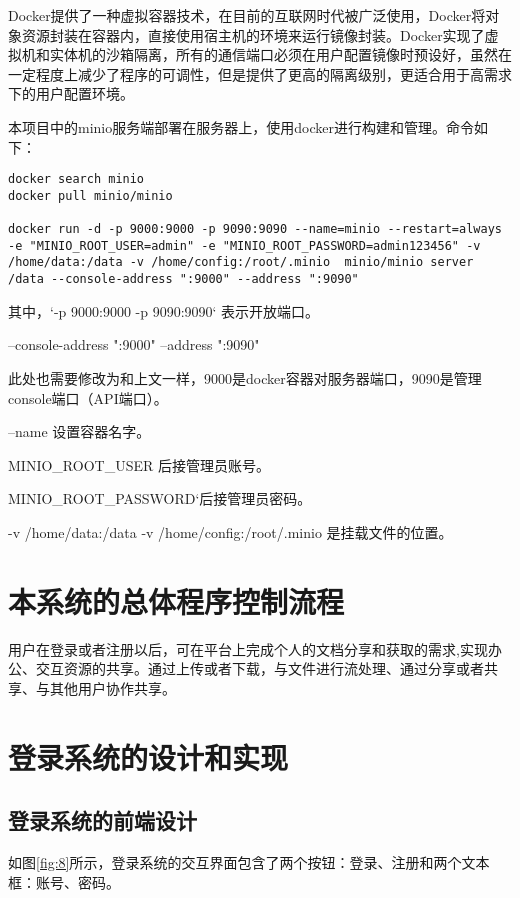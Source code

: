 \documentclass[forprint]{software}
\begin{document}
Docker提供了一种虚拟容器技术，在目前的互联网时代被广泛使用，Docker将对象资源封装在容器内，直接使用宿主机的环境来运行镜像封装。Docker实现了虚拟机和实体机的沙箱隔离，所有的通信端口必须在用户配置镜像时预设好，虽然在一定程度上减少了程序的可调性，但是提供了更高的隔离级别，更适合用于高需求下的用户配置环境。

本项目中的minio服务端部署在服务器上，使用docker进行构建和管理。命令如下：

\begin{lstlisting}
docker search minio
docker pull minio/minio

docker run -d -p 9000:9000 -p 9090:9090 --name=minio --restart=always -e "MINIO_ROOT_USER=admin" -e "MINIO_ROOT_PASSWORD=admin123456" -v /home/data:/data -v /home/config:/root/.minio  minio/minio server /data --console-address ":9000" --address ":9090"
\end{lstlisting}

其中，`-p 9000:9000 -p 9090:9090` 表示开放端口。

--console-address ":9000" --address ":9090"

此处也需要修改为和上文一样，9000是docker容器对服务器端口，9090是管理console端口（API端口）。

--name 设置容器名字。

MINIO\_ROOT\_USER 后接管理员账号。

MINIO\_ROOT\_PASSWORD`后接管理员密码。

-v /home/data:/data -v /home/config:/root/.minio 是挂载文件的位置。

\section{本系统的总体程序控制流程}

用户在登录或者注册以后，可在平台上完成个人的文档分享和获取的需求,实现办公、交互资源的共享。通过上传或者下载，与文件进行流处理、通过分享或者共享、与其他用户协作共享。

\section{登录系统的设计和实现}

\subsection{登录系统的前端设计}

如图\ref{fig:8}所示，登录系统的交互界面包含了两个按钮：登录、注册和两个文本框：账号、密码。
\end{document}
